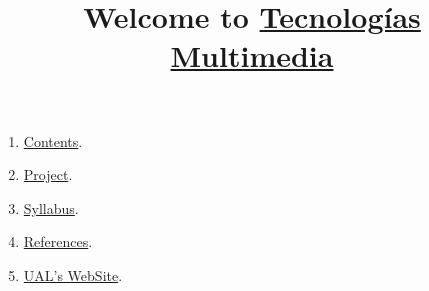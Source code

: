 
%
\title{Welcome to \href{https://www.ual.es/estudios/grados/presentacion/plandeestudios/asignatura/4015/40154321}{Tecnologías Multimedia}}

\maketitle

\begin{enumerate}
\item \href{https://tecnologias-multimedia.github.io/contents}{Contents}.
\item \href{https://github.com/Tecnologias-Multimedia/InterCom}{Project}.
\item \href{https://tecnologias-multimedia.github.io/syllabus}{Syllabus}.
\item \href{https://tecnologias-multimedia.github.io/references}{References}.
\item \href{https://www.ual.es/estudios/grados/presentacion/plandeestudios/asignatura/4015/40154321}{UAL's WebSite}.
\end{enumerate}
